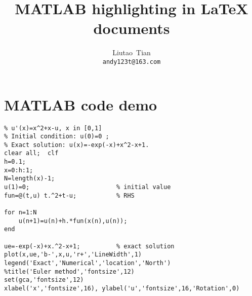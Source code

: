 \documentclass[11pt]{article}
\title{MATLAB highlighting in LaTeX documents}
\author{Liutao~Tian \\ \texttt{andy123t@163.com}}
\date{}
\begin{document}
\maketitle

\section{MATLAB code demo}

\begin{lstlisting}[title={Euler method}]
% Euler method for the ODE model
% u'(x)=x^2+x-u, x in [0,1]
% Initial condition: u(0)=0 ;
% Exact solution: u(x)=-exp(-x)+x^2-x+1.
clear all;  clf
h=0.1;
x=0:h:1;
N=length(x)-1;
u(1)=0;                        % initial value
fun=@(t,u) t.^2+t-u;           % RHS

for n=1:N
    u(n+1)=u(n)+h.*fun(x(n),u(n));
end

ue=-exp(-x)+x.^2-x+1;          % exact solution
plot(x,ue,'b-',x,u,'r+','LineWidth',1)
legend('Exact','Numerical','location','North')
%title('Euler method','fontsize',12)
set(gca,'fontsize',12)
xlabel('x','fontsize',16), ylabel('u','fontsize',16,'Rotation',0)
\end{lstlisting}
\end{document}
